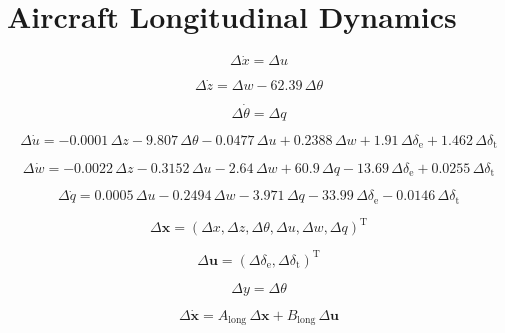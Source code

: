 \documentclass{article}
\begin{document}
\newpage

\section{Aircraft Longitudinal Dynamics}

\begin{dmath}
\Delta \dot{x}=\Delta u
\end{dmath}

\begin{dmath}
\Delta \dot{z}=\Delta w-62.39\,\Delta \theta
\end{dmath}

\begin{dmath}
\Delta \dot{\theta }=\Delta q
\end{dmath}

\begin{dmath}
\Delta \dot{u}=-0.0001\,\Delta z -9.807\,\Delta \theta -0.0477\,\Delta u+0.2388\,\Delta w+ 1.91\,\Delta \delta _{\mathrm{e}}+1.462\,\Delta \delta _{\mathrm{t}}
\end{dmath}

\begin{dmath}
\Delta \dot{w}=-0.0022\,\Delta z-0.3152\,\Delta u-2.64\,\Delta w+60.9\,\Delta q-13.69\,\Delta \delta _{\mathrm{e}}+0.0255\,\Delta \delta _{\mathrm{t}}
\end{dmath}

\begin{dmath}
\Delta \dot{q}=0.0005\,\Delta u-0.2494\,\Delta w-3.971\,\Delta q-33.99\,\Delta \delta _{\mathrm{e}}-0.0146\,\Delta \delta _{\mathrm{t}}
\end{dmath}

\begin{dmath}
\Delta \bm{x} = (\Delta x, \Delta z, \Delta \theta, \Delta u, \Delta w, \Delta q)^{\mathrm{T}}
\end{dmath}

\begin{dmath}
\Delta \bm{u} = (\Delta \delta _{\mathrm{e}}, \Delta \delta _{\mathrm{t}})^{\mathrm{T}}
\end{dmath}

\begin{dmath}
\Delta y = \Delta \theta
\end{dmath}

\begin{dmath}
\Delta \bm{\dot{x}} = A_{\mathrm{long}}\,\Delta\bm{x} + B_{\mathrm{long}}\,\Delta\bm{u}
\end{dmath}
\end{document}
